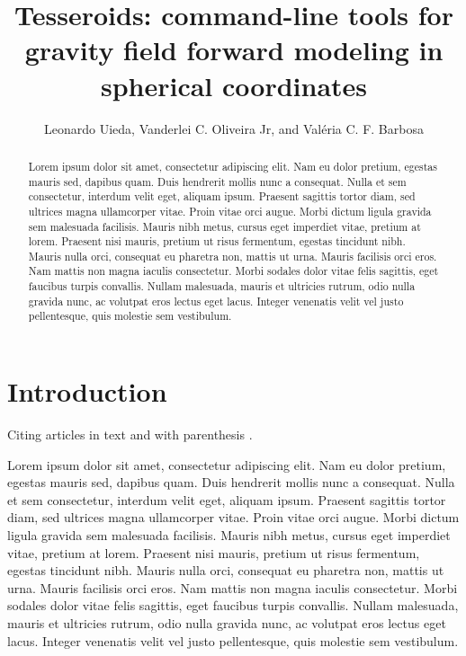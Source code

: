 \documentclass[manuscript]{geophysics}
\begin{document}
\title{
    Tesseroids:
    command-line tools for
    gravity field forward modeling
    in spherical coordinates
}

\ms{}

\address{
    \footnotemark[1]
    Universidade do Estado do Rio de Janeiro, Rio de Janeiro, Brazil,
    e-mail: \\
    \footnotemark[2]
    Observat\'orio Nacional, Rio de Janeiro, Brazil,
    e-mail:
}

\author{Leonardo Uieda\footnotemark[1]\footnotemark[2],
        Vanderlei C. Oliveira Jr\footnotemark[2],
        and
        Val\'eria C. F. Barbosa\footnotemark[2]}



\begin{abstract}
Lorem ipsum dolor sit amet, consectetur adipiscing elit. Nam eu dolor pretium,
egestas mauris sed, dapibus quam. Duis hendrerit mollis nunc a consequat. Nulla
et sem consectetur, interdum velit eget, aliquam ipsum. Praesent sagittis
tortor diam, sed ultrices magna ullamcorper vitae. Proin vitae orci augue.
Morbi dictum ligula gravida sem malesuada facilisis. Mauris nibh metus, cursus
eget imperdiet vitae, pretium at lorem. Praesent nisi mauris, pretium ut risus
fermentum, egestas tincidunt nibh. Mauris nulla orci, consequat eu pharetra
non, mattis ut urna. Mauris facilisis orci eros. Nam mattis non magna iaculis
consectetur. Morbi sodales dolor vitae felis sagittis, eget faucibus turpis
convallis. Nullam malesuada, mauris et ultricies rutrum, odio nulla gravida
nunc, ac volutpat eros lectus eget lacus. Integer venenatis velit vel justo
pellentesque, quis molestie sem vestibulum.
\end{abstract}

\section{Introduction}

Citing articles in text \citet{Asgharzadeh2007} and with parenthesis
\citep{Braitenberg2011}.

Lorem ipsum dolor sit amet, consectetur adipiscing elit. Nam eu dolor pretium,
egestas mauris sed, dapibus quam. Duis hendrerit mollis nunc a consequat. Nulla
et sem consectetur, interdum velit eget, aliquam ipsum. Praesent sagittis
tortor diam, sed ultrices magna ullamcorper vitae. Proin vitae orci augue.
Morbi dictum ligula gravida sem malesuada facilisis. Mauris nibh metus, cursus
eget imperdiet vitae, pretium at lorem. Praesent nisi mauris, pretium ut risus
fermentum, egestas tincidunt nibh. Mauris nulla orci, consequat eu pharetra
non, mattis ut urna. Mauris facilisis orci eros. Nam mattis non magna iaculis
consectetur. Morbi sodales dolor vitae felis sagittis, eget faucibus turpis
convallis. Nullam malesuada, mauris et ultricies rutrum, odio nulla gravida
nunc, ac volutpat eros lectus eget lacus. Integer venenatis velit vel justo
pellentesque, quis molestie sem vestibulum.
\end{document}
